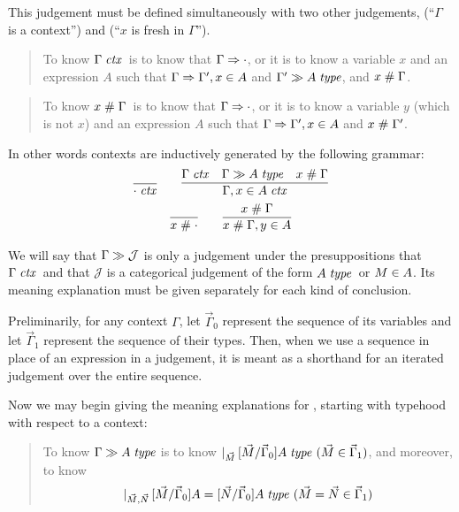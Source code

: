 \documentclass[main.tex]{subfiles}
\begin{document}
This judgement must be defined simultaneously with two other judgements,
\framebox{$\isctx{\Gamma}$} (``$\Gamma$ is a context'') and
 (``$x$ is fresh in $\Gamma$'').

\begin{quote}
  To know $\Gamma\;\mathit{ctx}$\ is to know that $\Gamma\Rightarrow\cdot$, or it is to know
  a variable $x$ and an expression $A$ such that $\Gamma\Rightarrow\Gamma', x\in A$
  and $\Gamma'\gg A\;\mathit{type}$, and $x\mathrel{\#}\Gamma$.
\end{quote}

\begin{quote}
  To know $x\mathrel{\#}\Gamma$\ is to know that $\Gamma\Rightarrow\cdot$, or it is to know
  a variable $y$ (which is not $x$) and an expression $A$ such that $\Gamma\Rightarrow\Gamma', x\in A$
  and $x\mathrel{\#}\Gamma'$.
\end{quote}

In other words contexts are inductively generated by the following grammar:
\begin{gather*}
  \infer{\isctx\cdot}{}
  \qquad
  \infer{
    \isctx{\Gamma,\ver{x}{A}}
  }{
    \isctx\Gamma &
    \sequent{\Gamma}{\isset{A}} &
    \fresh{x}{\Gamma}
  }\\
  \infer{\fresh{x}{\cdot}}{}
  \qquad
  \infer{
    \fresh{x}{\Gamma,\ver{y}{A}}
  }{
    \fresh{x}{\Gamma}
  }
\end{gather*}

We will say that $\Gamma\gg\mathcal{J}$ is only a judgement
under the presuppositions that $\Gamma\;\mathit{ctx}$\ and that $\mathcal{J}$
is a categorical judgement of the form $A\;\mathit{type}$\ or
$M\in A$. Its meaning explanation must be given separately for
each kind of conclusion.

Preliminarily, for any context $\Gamma$, let $\vec\Gamma_0$ represent the
sequence of its variables and let $\vec\Gamma_1$ represent the sequence of
their types. Then, when we use a sequence in place of an expression in a
judgement, it is meant as a shorthand for an iterated judgement over the entire
sequence.

Now we may begin giving the meaning explanations for
, starting with typehood with respect to a context:

\begin{quote}
  To know $\Gamma\gg A\;\mathit{type}$ is to know
  $\lvert_{\vec{M}}\,[\vec{M}/\vec\Gamma_0]A\;\mathit{type}\ (\vec{M}\in\vec\Gamma_1)$,
  and moreover, to know
  \[\lvert_{\vec{M},\vec{N}}\,[\vec{M}/\vec\Gamma_0]A =
  [\vec{N}/\vec\Gamma_0]A\;\mathit{type}\ (\vec{M}=\vec{N}\in\vec\Gamma_1)\]
\end{quote}
\end{document}
